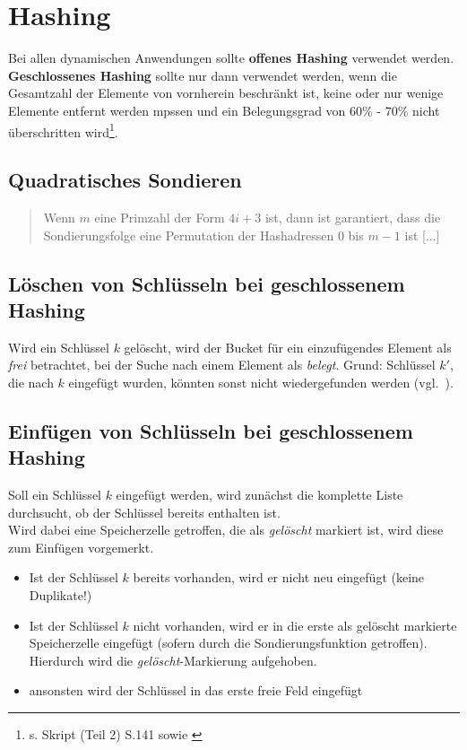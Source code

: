 \section{Hashing}

Bei allen dynamischen Anwendungen sollte \textbf{offenes Hashing} verwendet werden.\\
\textbf{Geschlossenes Hashing} sollte nur dann verwendet werden, wenn die Gesamtzahl der Elemente von vornherein beschränkt ist, keine oder nur wenige Elemente entfernt werden mpssen und ein Belegungsgrad von 60\% - 70\% nicht überschritten wird\footnote{s. Skript (Teil 2) S.141 sowie \cite[126]{GD18d}}.

\subsection{Quadratisches Sondieren}

\blockquote[{\cite[207]{OW17d}}]{
Wenn $m$ eine Primzahl der Form $4i+3$ ist, dann ist garantiert, dass die Sondierungsfolge eine Permutation der Hashadressen 0 bis $m-1$ ist [...]
}

\subsection{Löschen von Schlüsseln bei geschlossenem Hashing}
Wird ein Schlüssel $k$ gelöscht, wird der Bucket für ein einzufügendes Element als \textit{frei} betrachtet, bei der Suche nach einem Element als \textit{belegt}. Grund: Schlüssel $k'$, die nach $k$ eingefügt wurden, könnten sonst nicht wiedergefunden werden (vgl.~\cite[203]{OW17d}).\\

\subsection{Einfügen von Schlüsseln bei geschlossenem Hashing}
Soll ein Schlüssel $k$ eingefügt werden, wird zunächst die komplette Liste durchsucht, ob der Schlüssel bereits enthalten ist.\\
Wird dabei eine Speicherzelle getroffen, die als \textit{gelöscht} markiert ist, wird diese zum Einfügen vorgemerkt.\\
\begin{itemize}
    \item Ist der Schlüssel $k$ bereits vorhanden, wird er nicht neu eingefügt (keine Duplikate!)
    \item Ist der Schlüssel $k$ nicht vorhanden, wird er in die erste als gelöscht markierte Speicherzelle eingefügt (sofern durch die Sondierungsfunktion getroffen).
    Hierdurch wird die \textit{gelöscht}-Markierung aufgehoben.
    \item ansonsten wird der Schlüssel in das erste freie Feld eingefügt
\end{itemize}

